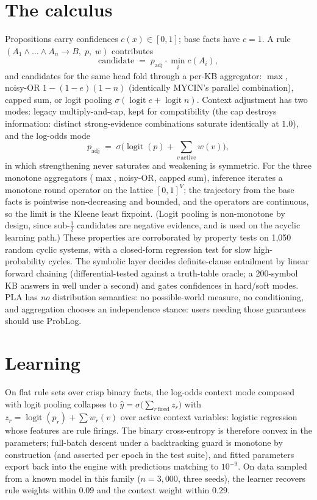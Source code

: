 \documentclass[10pt]{article}
\begin{document}
\section{The calculus}\label{sec:calculus}
Propositions carry confidences $c(x)\in[0,1]$; base facts have $c=1$. A
rule $(A_1\wedge\dots\wedge A_n \rightarrow B,\; p,\; w)$ contributes
\begin{equation}
\text{candidate} \;=\; p_{\text{adj}} \cdot \min_i c(A_i),
\end{equation}
and candidates for the same head fold through a per-KB aggregator:
$\max$, noisy-OR $1-(1-e)(1-n)$ (identically MYCIN's parallel
combination), capped sum, or logit pooling
$\sigma(\operatorname{logit} e + \operatorname{logit} n)$. Context
adjustment has two modes: legacy multiply-and-cap, kept for
compatibility (the cap destroys information: distinct strong-evidence
combinations saturate identically at $1.0$), and the log-odds mode
\begin{equation}
p_{\text{adj}} \;=\; \sigma\bigl(\operatorname{logit}(p) +
\textstyle\sum_{v\,\text{active}} w(v)\bigr),
\end{equation}
in which strengthening never saturates and weakening is symmetric.
For the three monotone aggregators ($\max$, noisy-OR, capped sum),
inference iterates a monotone round operator on the lattice $[0,1]^V$;
the trajectory from the base facts is pointwise non-decreasing and
bounded, and the operators are continuous, so the limit is the Kleene
least fixpoint. (Logit pooling
is non-monotone by design, since sub-$\tfrac12$ candidates are negative
evidence, and is used on the acyclic learning path.) These properties
are corroborated by property tests on 1{,}050 random cyclic systems, with a closed-form
regression test for slow high-probability cycles. The symbolic layer
decides definite-clause entailment by linear forward chaining
(differential-tested against a truth-table oracle; a 200-symbol KB
answers in well under a second) and gates confidences in hard/soft modes.
PLA has \emph{no} distribution semantics: no possible-world measure, no
conditioning, and aggregation chooses an independence stance: users
needing those guarantees should use ProbLog.

\section{Learning}\label{sec:learning}
On flat rule sets over crisp binary facts, the log-odds context mode composed with logit pooling
collapses to $\hat{y} = \sigma\bigl(\sum_{r\,\text{fired}} z_r\bigr)$ with
$z_r = \operatorname{logit}(p_r) + \sum w_r(v)$ over active context
variables: logistic regression whose features are rule firings. The
binary cross-entropy is therefore convex in the parameters; full-batch
descent under a backtracking guard is monotone by construction (and
asserted per epoch in the test suite), and fitted parameters export back into the engine with
predictions matching to $10^{-9}$. On data sampled from a known model in
this family ($n{=}3{,}000$, three seeds), the learner recovers rule
weights within $0.09$ and the context weight within $0.29$.
\end{document}
